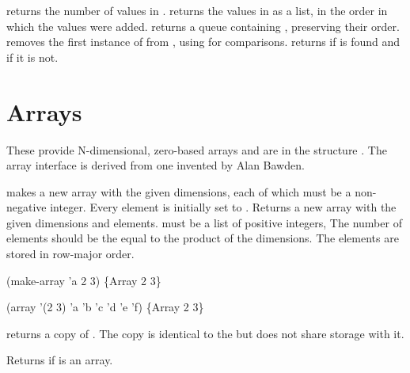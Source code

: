 \begin{protos}
\end{protos}
\noindent
{} returns the number of values in .
 returns the values in  as a list, in the
 order in which the values were added.
 returns a queue containing , preserving
 their order.
 removes the first instance of  from
 , using  for comparisons.
 returns  if  is found and
  if it is not.

\section{Arrays}

These provide N-dimensional, zero-based arrays and
 are in the structure .
The array interface is derived from one invented by Alan Bawden.

\begin{protos}
\end{protos}
\noindent
{} makes a new array with the given dimensions, each of which
 must be a non-negative integer.
Every element is initially set to .
 Returns a new array with the given dimensions and elements.
 must be a list of positive integers, 
The number of elements should be the equal to the product of the
 dimensions.
The elements are stored in row-major order.
\begin{example}
(make-array 'a 2 3) \evalsto \{Array 2 3\}

(array '(2 3) 'a 'b 'c 'd 'e 'f)
    \evalsto \{Array 2 3\}
\end{example}

 returns a copy of .
The copy is identical to the  but does not share storage with it.

\begin{protos}
\end{protos}
\noindent
Returns  if  is an array.

